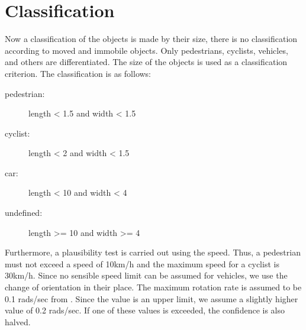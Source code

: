 \documentclass[11pt,oneside,openright]{mpreport}
\begin{document}
\section{Classification}
Now a classification of the objects is made by their size, there is no classification according to moved and immobile objects.
Only pedestrians, cyclists, vehicles, and others are differentiated. The size of the objects is used as a classification criterion.
The classification is as follows:
\begin{description}
\item[pedestrian:] length < 1.5 and width < 1.5
\item[cyclist:] length < 2 and width < 1.5
\item[car:] length < 10 and width < 4
\item[undefined:] length >= 10 and width >= 4
\end{description}


Furthermore, a plausibility test is carried out using the speed. Thus, a pedestrian must not exceed a speed of 10km/h and the maximum speed for a cyclist is 30km/h.
Since no sensible speed limit can be assumed for vehicles, we use the change of orientation in their place.
The maximum rotation rate is assumed to be 0.1 rads/sec from \cite{Kelly1994}. Since the value is an upper limit, we assume a slightly higher value of 0.2 rads/sec.
If one of these values is exceeded, the confidence is also halved.
\end{document}

